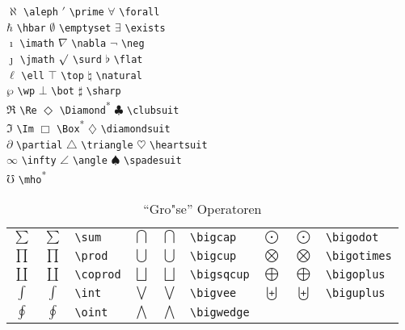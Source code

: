 \begin{table}[!htbp]
\caption[Verschiedene sonstige Symbole]%
        {Verschiedene sonstige Symbole
         (* ben"otigt Paket \texttt{latexsym})}
\begin{symbols}
$\aleph $\> \verb|\aleph| \>$\prime $\> \verb|\prime| \>
$\forall $\> \verb|\forall|  \\
$\hbar $\> \verb|\hbar| \>$\emptyset $\> \verb|\emptyset| \>
$\exists $\> \verb|\exists|  \\
$\imath $\> \verb|\imath| \>$\nabla $\> \verb|\nabla| \>
$\neg $\> \verb|\neg|  \\
$\jmath $\> \verb|\jmath| \>$\surd $\> \verb|\surd| \>
$\flat $\> \verb|\flat| \\
$\ell $\> \verb|\ell| \>$\top $\> \verb|\top| \>
$\natural $\> \verb|\natural| \\
$\wp $\> \verb|\wp| \>$\bot $\> \verb|\bot| \>$\sharp $\> \verb|\sharp| \\
$\Re $\> \verb|\Re| \>$\Diamond $\> \verb|\Diamond|\textsuperscript{*} \>$\clubsuit $\> \verb|\clubsuit| \\
$\Im $\> \verb|\Im| \>$\Box $\> \verb|\Box|\textsuperscript{*} \>$\diamondsuit $\>
\verb|\diamondsuit| \\
$\partial $\> \verb|\partial| \>$\triangle $\> \verb|\triangle| \>
$\heartsuit $\> \verb|\heartsuit| \\
$\infty $\> \verb|\infty| \>$\angle $\> \verb|\angle| \>
$\spadesuit $\> \verb|\spadesuit| \\
$\mho $\> \verb|\mho|\textsuperscript{*} \\
\end{symbols}
\end{table}


\begin{table}[!htbp]
\caption{"`Gro"se"' Operatoren}
\begin{trivlist}\item
\begin{tabular}{@{}ccl@{\qquad}cll@{\qquad}ccl@{}}
$\sum$     & $\displaystyle \sum$    & \verb|\sum|
  & $\bigcap$    & $\displaystyle\bigcap$    & \verb|\bigcap|
  & $\bigodot$   & $\displaystyle\bigodot$   & \verb|\bigodot| \\[6pt]
$\prod$    & $\displaystyle\prod$    & \verb|\prod|
  & $\bigcup$    & $\displaystyle\bigcup$    & \verb|\bigcup|
  & $\bigotimes$ & $\displaystyle\bigotimes$ & \verb|\bigotimes| \\[6pt]
$\coprod$  & $\displaystyle\coprod$  & \verb|\coprod|
  & $\bigsqcup$  & $\displaystyle\bigsqcup$  & \verb|\bigsqcup|
  & $\bigoplus$  & $\displaystyle\bigoplus$  & \verb|\bigoplus| \\[6pt]
$\int$     & $\displaystyle\int$     & \verb|\int|
  & $\bigvee$    & $\displaystyle\bigvee$    & \verb|\bigvee|
  & $\biguplus$  & $\displaystyle\biguplus$  & \verb|\biguplus| \\[6pt]
$\oint$    & $\displaystyle\oint$    & \verb|\oint|
  & $\bigwedge$  & $\displaystyle\bigwedge$  & \verb|\bigwedge|
\end{tabular}
\end{trivlist}
\end{table}


